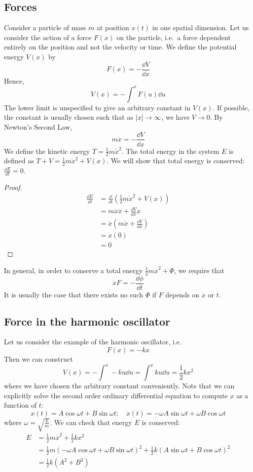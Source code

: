 \subsection{Forces}
Consider a particle of mass \(m\) at position \(x(t)\) in one spatial dimension.
Let us consider the action of a force \(F(x)\) on the particle, i.e.\ a force dependent entirely on the position and not the velocity or time.
We define the potential energy \(V(x)\) by
\[
	F(x) = -\frac{\dd{V}}{\dd{x}}
\]
Hence,
\[
	V(x) = - \int^x F(u) \dd{u}
\]
The lower limit is unspecified to give an arbitrary constant in \(V(x)\).
If possible, the constant is usually chosen such that as \(\abs{x} \to \infty\), we have \(V \to 0\).
By Newton's Second Law,
\[
	m\ddot{x} = -\frac{\dd{V}}{\dd{x}}
\]
We define the kinetic energy \(T = \frac{1}{2}m\dot x^2\).
The total energy in the system \(E\) is defined as \(T + V = \frac{1}{2} m \dot x^2 + V(x)\).
We will show that total energy is conserved: \(\frac{\dd{E}}{\dd{t}} = 0\).
\begin{proof}
	\begin{align*}
		\frac{\dd{E}}{\dd{t}} & = \frac{\dd}{\dd{t}}\left( \frac{1}{2}m\dot x^2 + V(x) \right) \\
		                      & = m\dot x \ddot x + \frac{\dd{V}}{\dd{x}} \dot x               \\
		                      & = \dot x\left( m \ddot x + \frac{\dd{V}}{\dd{x}} \right)       \\
		                      & = \dot x ( 0 )                                                 \\
		                      & = 0
	\end{align*}
\end{proof}
\noindent In general, in order to conserve a total energy \(\frac{1}{2}m\dot x^2 + \Phi\), we require that
\[
	\dot x F = -\frac{\dd{\phi}}{\dd{t}}
\]
It is usually the case that there exists no such \(\Phi\) if \(F\) depends on \(\dot x\) or \(t\).

\subsection{Force in the harmonic oscillator}
Let us consider the example of the harmonic oscillator, i.e.
\[
	F(x) = -kx
\]
Then we can construct
\[
	V(x) = -\int^x -ku \dd{u} = \int^x ku \dd{u} = \frac{1}{2} kx^2
\]
where we have chosen the arbitrary constant conveniently.
Note that we can explicitly solve the second order ordinary differential equation to compute \(x\) as a function of \(t\):
\[
	x(t) = A\cos \omega t + B\sin \omega t;\quad \dot x(t) = -\omega A \sin \omega t + \omega B \cos \omega t
\]
where \(\omega = \sqrt{\frac{k}{m}}\).
We can check that energy \(E\) is conserved:
\begin{align*}
	E & = \frac{1}{2}m\dot x^2 + \frac{1}{2}kx^2                                                                                                         \\
	  & = \frac{1}{2}m \left( -\omega A \cos \omega t + \omega B \sin \omega t \right)^2 + \frac{1}{2}k \left( A\sin \omega t + B\cos \omega t \right)^2 \\
	  & = \frac{1}{2}k(A^2 + B^2)
\end{align*}

